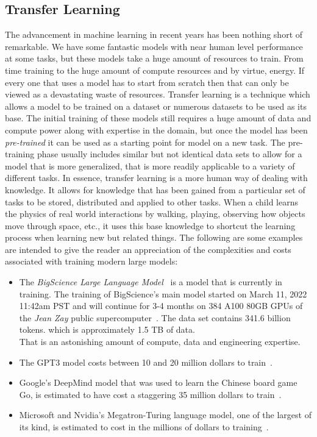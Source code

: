 \subsection{Transfer Learning}
\label{sec:transfer_learning}
The advancement in machine learning in recent years has been nothing short of remarkable. We have some fantastic models with near
human level performance at some tasks, but these models take a huge amount of resources to train. From time training to the huge amount of
compute resources and by virtue, energy. If every one that uses a model has to start from scratch then that can only be viewed as a devastating
waste of resources.
\bigbreak
Transfer learning is a technique which allows a model to be trained on a dataset or numerous datasets to be used as its base. The initial
training of these models still requires a huge amount of data and compute power along with expertise in the domain, but once the model has been
\emph{pre-trained} it can be used as a starting point for model on a new task. The pre-training phase usually includes similar but not identical
data sets to allow for a model that is more generalized, that is more readily applicable to a variety of different tasks.
\bigbreak
In essence, transfer learning is a more human way of dealing with knowledge. It allows for knowledge that has been gained from a particular set
of tasks to be stored, distributed and applied to other tasks. When a child learns the physics of real world interactions by walking, playing,
observing how objects move through space, etc., it uses this base knowledge to shortcut the learning process
when learning new but related things.
\bigbreak
The following are some examples are intended to give the reader an appreciation of the complexities and costs
associated with training modern large models:
\begin{itemize}
	\item The \emph{BigScience Large Language Model}~\autocite{BigScienceResearchWorkshop}
	      is a model that is currently in training. The training of BigScience's main model started on March 11, 2022 11:42am PST and will continue
	      for 3-4 months on 384 A100 80GB GPUs of the \emph{Jean Zay} public supercomputer~\autocite{BigscienceTr11176BmllogsHugging}. The data set
	      contains 341.6 billion tokens. which is approximately 1.5 TB of data.\\ That is an astonishing amount of compute, data and engineering expertise.
	\item The GPT3 model costs between 10 and 20 million dollars to train~\autocite{aiGPT3NoLonger}.
	\item Google's DeepMind model that was used to learn the Chinese board game Go, is estimated to have
	      cost a staggering 35 million dollars to train~\autocite{AIWeeklyAI2021}.
	\item Microsoft and Nvidia's Megatron-Turing language model, one of the largest of its kind, is estimated to cost in the
	      millions of dollars to training~\autocite{MicrosoftNvidiaTeam2021}.
\end{itemize}

